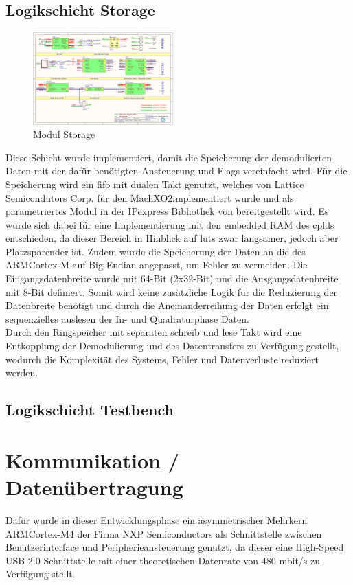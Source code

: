 \subsection{Logikschicht Storage}
\begin{figure}[h!]
	\centering
	\includegraphics[page=11,width=0.48\textwidth, trim=111mm 89mm 127mm 81mm, clip=true]{images/pcb/new.PDF}%
	\caption{Modul Storage}
	\label{fig:layer_fifo}
\end{figure}
Diese Schicht wurde implementiert, damit die Speicherung der demodulierten Daten mit der dafür benötigten Ansteuerung und Flags vereinfacht wird. Für die Speicherung wird ein \ac{fifo} mit dualen Takt genutzt, welches von Lattice Semicondutors Corp. für den MachXO2\SymbTM implementiert wurde und als parametriertes Modul in der IPexpress Bibliothek von \SymbTM bereitgestellt wird. Es wurde sich dabei für eine Implementierung mit den embedded RAM des \ac{cpld}s entschieden, da dieser Bereich in Hinblick auf \ac{lut}s zwar langsamer, jedoch aber Platzsparender ist. Zudem wurde die Speicherung der Daten an die des ARM\SymbReg Cortex\SymbReg-M auf Big Endian angepasst, um Fehler zu vermeiden. Die Eingangsdatenbreite wurde mit 64-Bit (2x32-Bit) und die Ausgangsdatenbreite mit 8-Bit definiert. Somit wird keine zusätzliche Logik für die Reduzierung der Datenbreite benötigt und durch die Aneinanderreihung der Daten erfolgt ein sequenzielles auslesen der In- und Quadraturphase Daten.\\
Durch den Ringspeicher mit separaten schreib und lese Takt wird eine Entkopplung der Demodulierung und des Datentransfers zu Verfügung gestellt, wodurch die Komplexität des Systems, Fehler und Datenverluste reduziert werden.
\vfill
\subsection{Logikschicht Testbench}

\newpage
\section{Kommunikation / Datenübertragung}
Dafür wurde in dieser Entwicklungsphase ein asymmetrischer Mehrkern ARM\SymbReg Cortex\SymbReg-M4 der Firma NXP Semiconductors als Schnittstelle zwischen Benutzerinterface und Peripherieansteuerung genutzt, da dieser eine High-Speed USB 2.0 Schnittstelle mit einer theoretischen Datenrate von 480 mbit/s zu Verfügung stellt.
